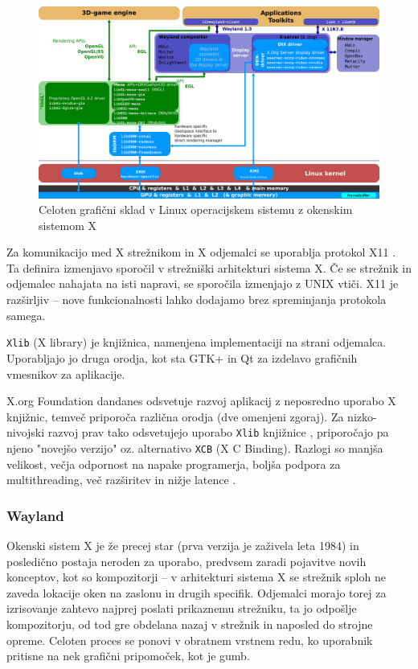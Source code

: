 \documentclass{article}
\begin{document}
\begin{figure}[H]
    \centering
    \includegraphics[width=\linewidth]{Linux_Graphics_Stack_2013}
    \caption{Celoten grafični sklad v Linux operacijskem sistemu z okenskim sistemom X}
\end{figure}

Za komunikacijo med X strežnikom in X odjemalci se uporablja protokol X11 \autocite{baeldunggui, wikixorg}. Ta definira izmenjavo sporočil v strežniški arhitekturi sistema X. Če se strežnik in odjemalec nahajata na isti napravi, se sporočila izmenjajo z UNIX vtiči.
X11 je razširljiv -- nove funkcionalnosti lahko dodajamo brez spreminjanja protokola samega.

\texttt{Xlib} (X library) je knjižnica, namenjena implementaciji na strani odjemalca. Uporabljajo jo druga orodja, kot sta GTK+ in Qt za izdelavo grafičnih vmesnikov za aplikacije.

X.org Foundation dandanes odsvetuje razvoj aplikacij z neposredno uporabo X knjižnic, temveč priporoča različna orodja (dve omenjeni zgoraj). Za nizko-nivojski razvoj prav tako odsvetujejo uporabo \texttt{Xlib} knjižnice \autocite{xorgdocs}, priporočajo pa njeno "novejšo verzijo" oz. alternativo \texttt{XCB} (X C Binding). Razlogi so manjša velikost, večja odpornost na napake programerja, boljša podpora za multithreading, več razširitev in nižje latence \autocite{xcb}.

\subsubsection{Wayland}
Okenski sistem X je že precej star (prva verzija je zaživela leta 1984) in posledično postaja neroden za uporabo, predvsem zaradi pojavitve novih konceptov, kot so kompozitorji -- v arhitekturi sistema X se strežnik sploh ne zaveda lokacije oken na zaslonu in drugih specifik. Odjemalci morajo torej za izrisovanje zahtevo najprej poslati prikaznemu strežniku, ta jo odpošlje kompozitorju, od tod gre obdelana nazaj v strežnik in naposled do strojne opreme. Celoten proces se ponovi v obratnem vrstnem redu, ko uporabnik pritisne na nek grafični pripomoček, kot je gumb. 
\end{document}
